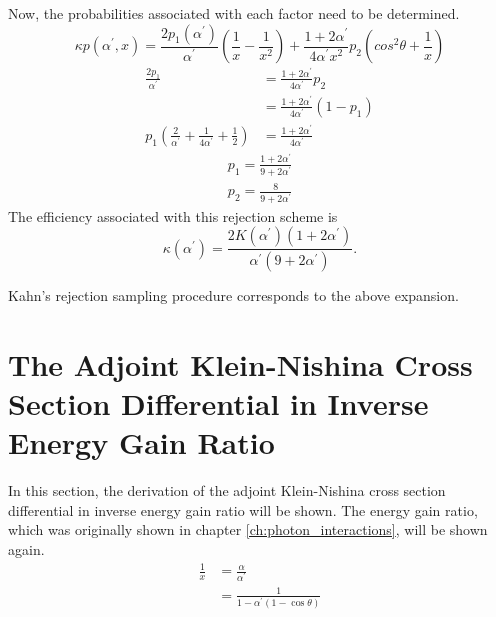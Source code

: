 Now, the probabilities associated with each factor need to be determined.
\begin{equation*}
  \kappa p(\alpha^{'},x) = \frac{2 p_1(\alpha^{'})}{\alpha^{'}}
  \left(\frac{1}{x} - \frac{1}{x^2}\right) + 
  \frac{1+2\alpha^{'}}{4\alpha^{'}x^2}p_2 \left(cos^2\theta + \frac{1}{x}\right)
\end{equation*}
\begin{align}
  \frac{2p_1}{\alpha^{'}} & = \frac{1+2\alpha^{'}}{4\alpha^{'}}p_2 \nonumber \\
  & = \frac{1+2\alpha^{'}}{4\alpha^{'}}(1-p_1) \nonumber \\
  p_1\left(\frac{2}{\alpha^{'}} + \frac{1}{4\alpha^{'}} + \frac{1}{2} \right)
  & = \frac{1+2\alpha^{'}}{4\alpha^{'}} \nonumber
\end{align}
\begin{align}
  p_1 = \frac{1+2\alpha^{'}}{9 + 2\alpha^{'}} \\
  p_2 = \frac{8}{9 + 2\alpha^{'}}
\end{align}
The efficiency associated with this rejection scheme is
\begin{equation}
  \kappa(\alpha^{'}) = \frac{2 K(\alpha^{'})(1+2\alpha^{'})}
  {\alpha^{'}(9+2\alpha^{'})}.
\end{equation}

Kahn's rejection sampling procedure corresponds to the above expansion.
  
\section{The Adjoint Klein-Nishina Cross Section Differential in Inverse Energy Gain Ratio}
In this section, the derivation of the adjoint Klein-Nishina cross section
differential in inverse energy gain ratio will be shown. The energy gain
ratio, which was originally shown in chapter \ref{ch:photon_interactions}, 
will be shown again.
\begin{align}
  \frac{1}{x} & = \frac{\alpha}{\alpha^{'}} \nonumber \\
  & = \frac{1}{1 - \alpha^{'}(1-\cos{\theta})} \nonumber
\end{align}

